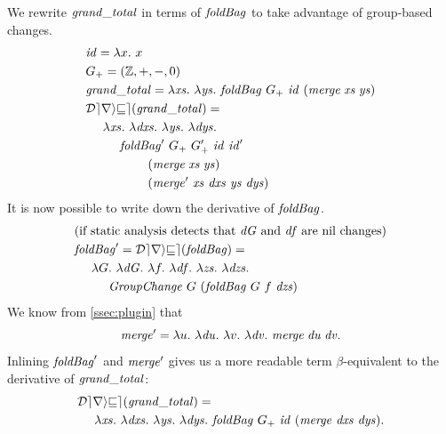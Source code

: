 We rewrite $\mathit{grand\_total}$ in terms of $\mathit{foldBag}$ to take advantage of
group-based changes.
{\DeriveProgramEnv
\begin{align*}
&\Term{id}=\Lam{x}{x}\\
&G_+ = (\mathbb Z, +, -, 0)\\
&\Program = \Lam{\Xs}{\Lam{\Ys}{\FOLDBAG~G_+~\Term{id}~(\Merge\Xs\Ys)}}\\
&\Derive\Program=\\
&\zero
\Lam{\Xs}{\Lam{\DXs}{}}\Lam{\Ys}{\Lam{\DYs}{}}\\
&\one
\FOLDBAG'~G_+~G_+'~\Term{id}~\Term{id}'\\
&\two
(\Merge\Xs\Ys)\\
&\two
(\MERGE'~\Xs~\DXs~\Ys~\DYs)
\end{align*}
}%
It is now possible to write down the derivative of $\mathit{foldBag}$.
{\DeriveProgramEnv
\begin{align*}
&\text{(if static analysis detects that $\D G$ and $\D f$
are nil changes)}\\
&\FOLDBAG'=\Derive{\FOLDBAG}=\\
&\zero
\Lam{G}{\Lam{\D G}{\Lam{f}{\Lam{\D f}{
\Lam{\Zs}{\Lam{\DZs}{}}}}}}\\
&\one
\Term{GroupChange}~G~
(\FOLDBAG~G~f~\DZs)
\end{align*}
}%
We know from \cref{ssec:plugin} that
\[
\MERGE'=\Lam{u}{\Lam{\D u}{\Lam{v}{\Lam{\D v}{\Merge{\D u}{\D v}}}}}.
\]
Inlining $\mathit{foldBag}'$ and $\mathit{merge}'$ gives us a more readable term
$\beta$-equivalent to the derivative of $\mathit{grand\_total}$:
{\DeriveProgramEnv
\begin{align*}
&\Derive\Program=\\
&\zero
\Lam{\Xs}{\Lam{\DXs}{}}\Lam{\Ys}{\Lam{\DYs}{}}
%
\FOLDBAG~G_+~\Term{id}~
(\MERGE~\DXs~\DYs).
\end{align*}
}%

